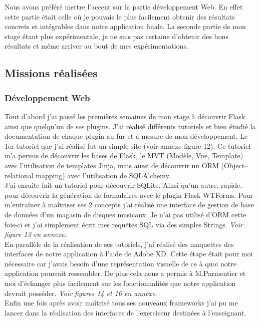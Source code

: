 \documentclass[12pt]{article}
\begin{document}
Nous avons préféré mettre l'accent sur la partie développement Web. En effet cette partie était celle où je pouvais le plus facilement obtenir des résultats concrets et intégrables dans notre application finale. La seconde partie de mon stage étant plus expérimentale, je ne suis pas certaine d'obtenir des bons résultats et même arriver au bout de mes expérimentations.  

\subsection{Missions réalisées}

\subsubsection{Développement Web}

Tout d’abord j’ai passé les premières semaines de mon stage à découvrir Flask ainsi que quelqu’un de ses plugins. J’ai réalisé différents tutoriels et bien étudié la documentation de chaque plugin au fur et à mesure de mon développement. Le 1er tutoriel que j’ai réalisé fut un simple site (voir annexe figure 12). Ce tutoriel m’a permis de découvrir les bases de Flask, le MVT (Modèle, Vue, Template) avec l’utilisation de templates Jinja, mais aussi de découvrir un ORM (Object–relational mapping) avec l’utilisation de SQLAlchemy. \\

J’ai ensuite fait un tutoriel pour découvrir SQLite. Ainsi qu’un autre, rapide, pour découvrir la génération de formulaires avec le plugin Flask WTForms. Pour m’entraîner à maîtriser ses 2 concepts j’ai réalisé une interface de gestion de base de données d’un magasin de disques musicaux. Je n’ai pas utilisé d’ORM cette fois-ci et j’ai simplement écrit mes requêtes SQL via des simples Strings. \textit{Voir figure 13 en annexe}. \\

En parallèle de la réalisation de ses tutoriels, j’ai réalisé des maquettes des interfaces de notre application à l’aide de Adobe XD. Cette étape était pour moi nécessaire car j’avais besoin d’une représentation visuelle de ce à quoi notre application pourrait ressembler. De plus cela nous a permis à M.Parmentier et moi d’échanger plus facilement sur les fonctionnalités que notre application devrait posséder.   \textit{Voir figures 14 et 16 en annexe}. \\
 
Enfin une fois après avoir maîtrisé tous ses nouveaux frameworks j’ai pu me lancer dans la réalisation des interfaces de l’exerciseur destinées à l’enseignant. \\
\end{document}
